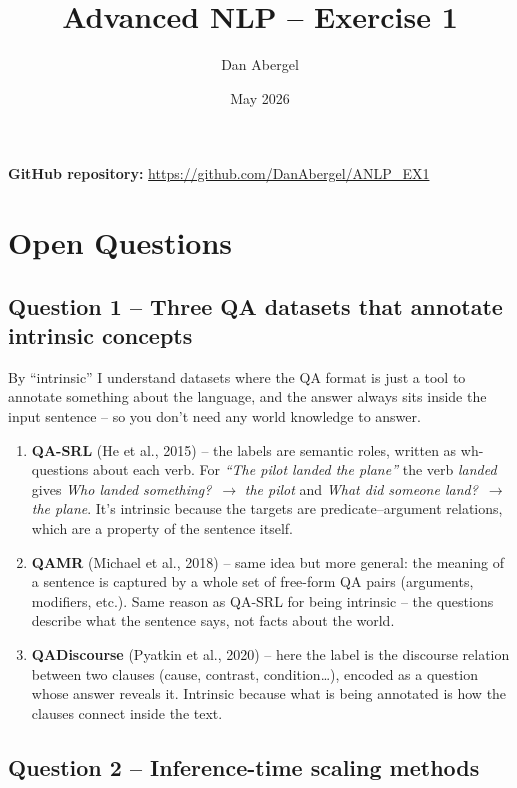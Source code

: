 \documentclass[11pt]{article}
\title{Advanced NLP -- Exercise 1}
\author{Dan Abergel}
\date{May 2026}
\begin{document}
\maketitle

\noindent
\textbf{GitHub repository:} \url{https://github.com/DanAbergel/ANLP_EX1}

\section{Open Questions}

\subsection*{Question 1 -- Three QA datasets that annotate intrinsic concepts}

By ``intrinsic'' I understand datasets where the QA format is just a tool to annotate something about the language, and the answer always sits inside the input sentence -- so you don't need any world knowledge to answer.

\begin{enumerate}[leftmargin=*]
    \item \textbf{QA-SRL} (He et al., 2015) -- the labels are semantic roles, written as wh-questions about each verb. For \emph{``The pilot landed the plane''} the verb \emph{landed} gives \emph{Who landed something?}~$\rightarrow$ \emph{the pilot} and \emph{What did someone land?}~$\rightarrow$ \emph{the plane}. It's intrinsic because the targets are predicate--argument relations, which are a property of the sentence itself.

    \item \textbf{QAMR} (Michael et al., 2018) -- same idea but more general: the meaning of a sentence is captured by a whole set of free-form QA pairs (arguments, modifiers, etc.). Same reason as QA-SRL for being intrinsic -- the questions describe what the sentence says, not facts about the world.

    \item \textbf{QADiscourse} (Pyatkin et al., 2020) -- here the label is the discourse relation between two clauses (cause, contrast, condition\ldots), encoded as a question whose answer reveals it. Intrinsic because what is being annotated is how the clauses connect inside the text.
\end{enumerate}

\subsection*{Question 2 -- Inference-time scaling methods}
\end{document}
